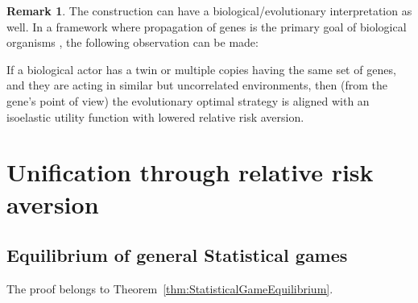 \documentclass{article}
\theoremstyle{definition}
\newtheorem*{remark}{Remark}
\begin{document}
\begin{remark}
    The construction can have a biological/evolutionary interpretation as well. In a framework where propagation of genes is the primary goal of biological organisms \cite{book:SelfishGene,book:TheOriginsOfLife}, the following observation can be made:

    If a biological actor has a twin or multiple copies having the same set of genes, and they are acting in similar but uncorrelated environments, then (from the gene's point of view) the evolutionary optimal strategy is aligned with an isoelastic utility function with lowered relative risk aversion.
    
\end{remark}

\section{Unification through relative risk aversion}
\label{appendix:Unifiction}

\subsection{Equilibrium of general Statistical games}

The proof belongs to Theorem~\ref{thm:StatisticalGameEquilibrium}.
\end{document}
